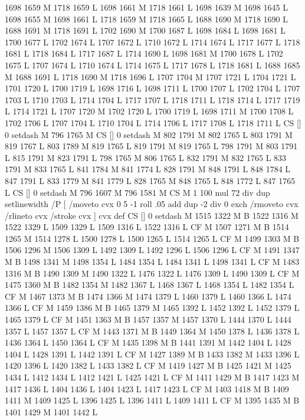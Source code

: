 {{{{{{{{{{{{{{{{{{{{{{{{1698 1659 M 1718 1659 L
1698 1661 M 1718 1661 L
1698 1639 M 1698 1645 L
1698 1655 M 1698 1661 L
1718 1659 M 1718 1665 L
1688 1690 M 1718 1690 L
1688 1691 M 1718 1691 L
1702 1690 M 1700 1687 L
1698 1684 L
1698 1681 L
1700 1677 L
1702 1674 L
1707 1672 L
1710 1672 L
1714 1674 L
1717 1677 L
1718 1681 L
1718 1684 L
1717 1687 L
1714 1690 L
1698 1681 M 1700 1678 L
1702 1675 L
1707 1674 L
1710 1674 L
1714 1675 L
1717 1678 L
1718 1681 L
1688 1685 M 1688 1691 L
1718 1690 M 1718 1696 L
1707 1704 M 1707 1721 L
1704 1721 L
1701 1720 L
1700 1719 L
1698 1716 L
1698 1711 L
1700 1707 L
1702 1704 L
1707 1703 L
1710 1703 L
1714 1704 L
1717 1707 L
1718 1711 L
1718 1714 L
1717 1719 L
1714 1721 L
1707 1720 M 1702 1720 L
1700 1719 L
1698 1711 M 1700 1708 L
1702 1706 L
1707 1704 L
1710 1704 L
1714 1706 L
1717 1708 L
1718 1711 L
CS [] 0 setdash M
796 1765 M CS [] 0 setdash M
802 1791 M 802 1765 L
803 1791 M 819 1767 L
803 1789 M 819 1765 L
819 1791 M 819 1765 L
798 1791 M 803 1791 L
815 1791 M 823 1791 L
798 1765 M 806 1765 L
832 1791 M 832 1765 L
833 1791 M 833 1765 L
841 1784 M 841 1774 L
828 1791 M 848 1791 L
848 1784 L
847 1791 L
833 1779 M 841 1779 L
828 1765 M 848 1765 L
848 1772 L
847 1765 L
CS [] 0 setdash M
796 1607 M 796 1581 M CS M 1 100 mul 72 div dup setlinewidth
/P [ /moveto cvx 0 5 -1 roll .05 add dup -2 div 0 exch /rmoveto cvx /rlineto cvx /stroke cvx ] cvx def
CS [] 0 setdash M
1515 1322 M B
1522 1316 M 1522 1329 L
1509 1329 L
1509 1316 L
1522 1316 L
CF M
1507 1271 M B
1514 1265 M 1514 1278 L
1500 1278 L
1500 1265 L
1514 1265 L
CF M
1499 1303 M B
1506 1296 M 1506 1309 L
1492 1309 L
1492 1296 L
1506 1296 L
CF M
1491 1347 M B
1498 1341 M 1498 1354 L
1484 1354 L
1484 1341 L
1498 1341 L
CF M
1483 1316 M B
1490 1309 M 1490 1322 L
1476 1322 L
1476 1309 L
1490 1309 L
CF M
1475 1360 M B
1482 1354 M 1482 1367 L
1468 1367 L
1468 1354 L
1482 1354 L
CF M
1467 1373 M B
1474 1366 M 1474 1379 L
1460 1379 L
1460 1366 L
1474 1366 L
CF M
1459 1386 M B
1465 1379 M 1465 1392 L
1452 1392 L
1452 1379 L
1465 1379 L
CF M
1451 1363 M B
1457 1357 M 1457 1370 L
1444 1370 L
1444 1357 L
1457 1357 L
CF M
1443 1371 M B
1449 1364 M 1450 1378 L
1436 1378 L
1436 1364 L
1450 1364 L
CF M
1435 1398 M B
1441 1391 M 1442 1404 L
1428 1404 L
1428 1391 L
1442 1391 L
CF M
1427 1389 M B
1433 1382 M 1433 1396 L
1420 1396 L
1420 1382 L
1433 1382 L
CF M
1419 1427 M B
1425 1421 M 1425 1434 L
1412 1434 L
1412 1421 L
1425 1421 L
CF M
1411 1429 M B
1417 1423 M 1417 1436 L
1404 1436 L
1404 1423 L
1417 1423 L
CF M
1403 1418 M B
1409 1411 M 1409 1425 L
1396 1425 L
1396 1411 L
1409 1411 L
CF M
1395 1435 M B
1401 1429 M 1401 1442 L
}}}}}}}}}}}}}}}}}}}}}}}}
